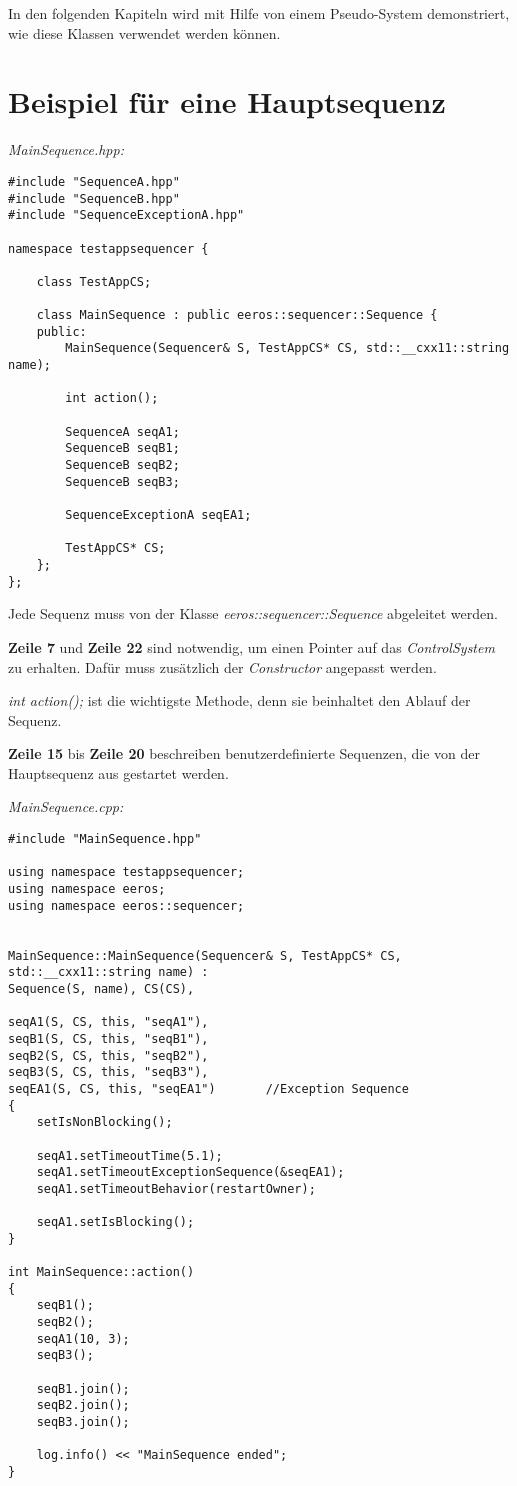 In den folgenden Kapiteln wird mit Hilfe von einem Pseudo-System demonstriert, wie diese Klassen verwendet werden können.

\section{Beispiel für eine Hauptsequenz}

\textit{MainSequence.hpp:}\
\begin{lstlisting}
#include "SequenceA.hpp"
#include "SequenceB.hpp"
#include "SequenceExceptionA.hpp"

namespace testappsequencer {

	class TestAppCS;
	
	class MainSequence : public eeros::sequencer::Sequence {
	public:
		MainSequence(Sequencer& S, TestAppCS* CS, std::__cxx11::string name);

		int action();
		
		SequenceA seqA1;
		SequenceB seqB1; 
		SequenceB seqB2; 
		SequenceB seqB3;
		
		SequenceExceptionA seqEA1;
		
		TestAppCS* CS;
	};
};
\end{lstlisting}

Jede Sequenz muss von der Klasse \textit{eeros::sequencer::Sequence} abgeleitet werden.

\textbf{Zeile 7} und \textbf{Zeile 22} sind notwendig, um einen Pointer auf das \textit{ControlSystem} zu erhalten.
Dafür muss zusätzlich der \textit{Constructor} angepasst werden.

\textit{int action();} ist die wichtigste Methode, denn sie beinhaltet den Ablauf der Sequenz.

\textbf{Zeile 15} bis \textbf{Zeile 20} beschreiben benutzerdefinierte Sequenzen, die von der Hauptsequenz aus gestartet werden.


\textit{MainSequence.cpp:}\
\begin{lstlisting}
#include "MainSequence.hpp"

using namespace testappsequencer;
using namespace eeros;
using namespace eeros::sequencer;


MainSequence::MainSequence(Sequencer& S, TestAppCS* CS, std::__cxx11::string name) :
Sequence(S, name), CS(CS),

seqA1(S, CS, this, "seqA1"),
seqB1(S, CS, this, "seqB1"),
seqB2(S, CS, this, "seqB2"),
seqB3(S, CS, this, "seqB3"),
seqEA1(S, CS, this, "seqEA1")		//Exception Sequence
{
	setIsNonBlocking();
	
	seqA1.setTimeoutTime(5.1);
	seqA1.setTimeoutExceptionSequence(&seqEA1);
	seqA1.setTimeoutBehavior(restartOwner);
	
	seqA1.setIsBlocking();
}

int MainSequence::action()
{
	seqB1();
	seqB2();
	seqA1(10, 3);
	seqB3();
	
	seqB1.join();
	seqB2.join();
	seqB3.join();
	
	log.info() << "MainSequence ended";
}
\end{lstlisting}


